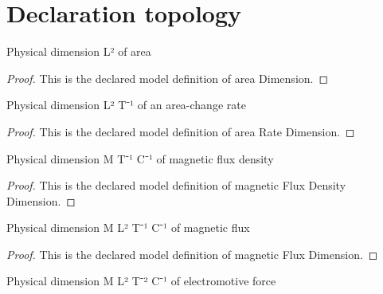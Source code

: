 \section{Declaration topology}
\begin{definition}
  \label{def:physics:phyx-mini-0931:phyxminiproblems-problemphyxmini0931-areadimension}
  Physical dimension L² of area
\end{definition}
\begin{proof}
  This is the declared model definition of area Dimension.
\end{proof}
\begin{definition}
  \label{def:physics:phyx-mini-0931:phyxminiproblems-problemphyxmini0931-arearatedimension}
  Physical dimension L² T⁻¹ of an area-change rate
\end{definition}
\begin{proof}
  This is the declared model definition of area Rate Dimension.
\end{proof}
\begin{definition}
  \label{def:physics:phyx-mini-0931:phyxminiproblems-problemphyxmini0931-magneticfluxdensitydimension}
  Physical dimension M T⁻¹ C⁻¹ of magnetic flux density
\end{definition}
\begin{proof}
  This is the declared model definition of magnetic Flux Density Dimension.
\end{proof}
\begin{definition}
  \label{def:physics:phyx-mini-0931:phyxminiproblems-problemphyxmini0931-magneticfluxdimension}
  Physical dimension M L² T⁻¹ C⁻¹ of magnetic flux
\end{definition}
\begin{proof}
  This is the declared model definition of magnetic Flux Dimension.
\end{proof}
\begin{definition}
  \label{def:physics:phyx-mini-0931:phyxminiproblems-problemphyxmini0931-electromotiveforcedimension}
  Physical dimension M L² T⁻² C⁻¹ of electromotive force
\end{definition}
